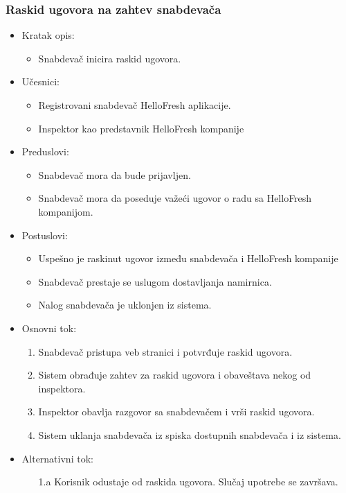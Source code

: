\subsubsection{Raskid ugovora na zahtev snabdevača}

\begin{itemize}
    \item Kratak opis:
        \begin{itemize}
            \item Snabdevač inicira raskid ugovora.
        \end{itemize}
    \item Učesnici:
        \begin{itemize}
            \item Registrovani snabdevač HelloFresh aplikacije.
            \item Inspektor kao predstavnik HelloFresh kompanije
        \end{itemize}
    \item Preduslovi:
        \begin{itemize}
            \item Snabdevač mora da bude prijavljen.
            \item Snabdevač mora da poseduje važeći ugovor o radu sa HelloFresh kompanijom.
        \end{itemize}
    \item Postuslovi:
        \begin{itemize}
            \item Uspešno je raskinut ugovor između snabdevača i HelloFresh kompanije
            \item Snabdevač prestaje se uslugom dostavljanja namirnica.
            \item Nalog snabdevača je uklonjen iz sistema.
        \end{itemize}
    \item Osnovni tok:
        \begin{enumerate}
            \item Snabdevač pristupa veb stranici i potvrđuje raskid ugovora.
            \item Sistem obrađuje zahtev za raskid ugovora i obaveštava nekog od inspektora.
            \item Inspektor obavlja razgovor sa snabdevačem i vrši raskid ugovora.
            \item Sistem uklanja snabdevača iz spiska dostupnih snabdevača i iz sistema.
        \end{enumerate}
    \item Alternativni tok:
        \begin{itemize}
            \item[1.a] Korisnik odustaje od raskida ugovora. Slučaj upotrebe se završava.
        \end{itemize}
\end{itemize}


